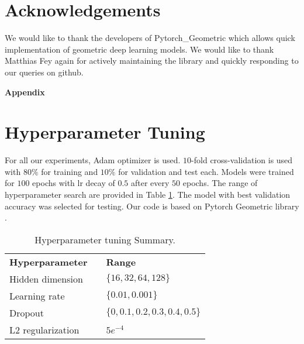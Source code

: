 \documentclass[letterpaper]{article} \usepackage{aaai20}  \usepackage{times}  \usepackage{helvet} \usepackage{courier}  \usepackage[hyphens]{url}  \usepackage{graphicx} \urlstyle{rm} \def\UrlFont{\rm}  \usepackage{graphicx}  \frenchspacing  \setlength{\pdfpagewidth}{8.5in}  \setlength{\pdfpageheight}{11in}
\begin{document}
%
 
\section{Acknowledgements}
We would like to thank the developers of Pytorch\_Geometric \cite{bhai} which allows quick implementation of geometric deep learning models. We would like to thank Matthias Fey again for actively maintaining the library and quickly responding to our queries on github.



{\fontsize{9.0pt}{10.0pt} \selectfont }



\appendix


\setcounter{secnumdepth}{1}
	
\vspace{1cm}
	{\hspace{2.7cm} \textbf{\LARGE Appendix}}
	
	
	\section{Hyperparameter Tuning}
	\label{ssec:hyper-tune}
	For all our experiments, Adam \cite{adam} optimizer is used. $10$-fold cross-validation is used with $80\%$ for training and $10\%$ for validation and test each. Models were trained for $100$ epochs with lr decay of $0.5$ after every $50$ epochs. The range of hyperparameter search are provided in Table \ref{tab:hyper-tune}. The model with best validation accuracy was selected for testing. Our code is based on Pytorch Geometric library \cite{bhai}.
	
	
	\begin{table}[tbh!]
		\begin{center}
			\begin{small}
\begin{tabular}{lcl}
					\toprule
					\textbf{Hyperparameter} & & \textbf{Range} \\
					\cmidrule{1-3}
Hidden dimension & & $\{16, 32, 64, 128\}$ \\
					Learning rate & & $\{0.01, 0.001\}$ \\
					Dropout & & $\{0, 0.1, 0.2, 0.3, 0.4, 0.5\}$\\
					L2 regularization & & $5e^{-4}$ \\
					\bottomrule
				\end{tabular}
				\caption{\label{tab:hyper-tune} Hyperparameter tuning Summary.}
			\end{small}
		\end{center}
	\end{table}
	
\end{document}
